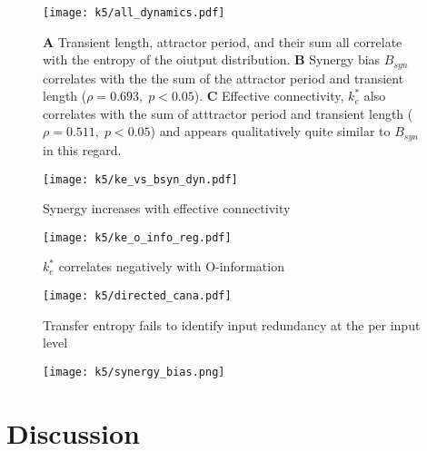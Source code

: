 \documentclass[12 pt]{article}
\begin{document}
\begin{figure}
    \texttt{[image: k5/all\_dynamics.pdf]}
    \caption{\textbf{A} Transient length, attractor period, and their sum all 
    correlate with the entropy of the oiutput distribution. \textbf{B} Synergy 
    bias $B_{syn}$ correlates with the the sum of the attractor period and 
    transient length ($\rho=0.693, \; p<0.05$). \textbf{C} Effective
    connectivity, $k_e^*$ also correlates with the sum of atttractor period and
    transient length ($\rho=0.511, \; p<0.05$) and appears qualitatively quite
    similar to $B_{syn}$ in this regard.}
    \label{fig:dynamics}
\end{figure} 

\begin{figure}
    \texttt{[image: k5/ke\_vs\_bsyn\_dyn.pdf]}
    \caption{Synergy increases with effective connectivity}
    \label{fig:ke-bsyn}
\end{figure}

\begin{figure}
    \texttt{[image: k5/ke\_o\_info\_reg.pdf]}
    \caption{$k_e^*$ correlates negatively with O-information}
    \label{fig:ke-oinfo}
\end{figure}

\begin{figure}
    \texttt{[image: k5/directed\_cana.pdf]}
    \caption{Transfer entropy fails to identify input redundancy at the per input level}
    \label{fig:r-te}
\end{figure}

\begin{figure}
    \texttt{[image: k5/synergy\_bias.png]}
\end{figure}

\section{Discussion}
\end{document}
